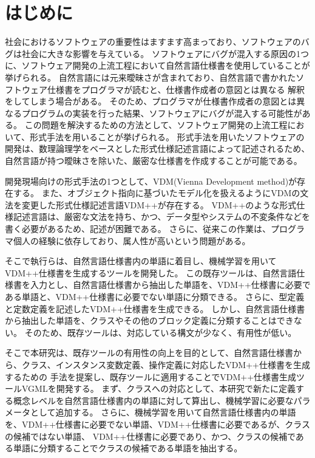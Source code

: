 \chapter{はじめに}
\label{cha:Introduction}

社会におけるソフトウェアの重要性はますます高まっており、ソフトウェアのバグは社会に大きな影響を与えている\cite{}。
ソフトウェアにバグが混入する原因の1つに、ソフトウェア開発の上流工程において自然言語仕様書を使用していることが挙げられる。
自然言語には元来曖昧さが含まれており、自然言語で書かれたソフトウェア仕様書をプログラマが読むと、仕様書作成者の意図とは異なる
解釈をしてしまう場合がある。
そのため、プログラマが仕様書作成者の意図とは異なるプログラムの実装を行った結果、ソフトウェアにバグが混入する可能性がある。
この問題を解決するための方法として、ソフトウェア開発の上流工程において、形式手法を用いることが挙げられる。
形式手法を用いたソフトウェアの開発は、数理論理学をベースとした形式仕様記述言語によって記述されるため、
自然言語が持つ曖昧さを除いた、厳密な仕様書を作成することが可能である。

開発現場向けの形式手法の1つとして、VDM(Vienna Development method)\cite{}が存在する。
また、オブジェクト指向に基づいたモデル化を扱えるようにVDMの文法を変更した形式仕様記述言語VDM++が存在する。
VDM++のような形式仕様記述言語は、厳密な文法を持ち、かつ、データ型やシステムの不変条件などを書く必要があるため、記述が困難である。
さらに、従来この作業は、プログラマ個人の経験に依存しており、属人性が高いという問題がある。

そこで執行らは、自然言語仕様書内の単語に着目し、機械学習を用いてVDM++仕様書を生成するツールを開発した\cite{}。
この既存ツールは、自然言語仕様書を入力とし、自然言語仕様書から抽出した単語を、VDM++仕様書に必要である単語と、VDM++仕様書に必要でない単語に分類できる。
さらに、型定義と定数定義を記述したVDM++仕様書を生成できる。
しかし、自然言語仕様書から抽出した単語を、クラスやその他のブロック定義に分類することはできない。
そのため、既存ツールは、対応している構文が少なく、有用性が低い。

そこで本研究は、既存ツールの有用性の向上を目的として、自然言語仕様書から、クラス、インスタンス変数定義、操作定義に対応したVDM++仕様書を生成するための
手法を提案し、既存ツールに適用することでVDM++仕様書生成ツールVGMLを開発する。
まず、クラスへの対応として、本研究で新たに定義する概念レベルを自然言語仕様書内の単語に対して算出し、機械学習に必要なパラメータとして追加する。
さらに、機械学習を用いて自然言語仕様書内の単語を、VDM++仕様書に必要でない単語、VDM++仕様書に必要であるが、クラスの候補ではない単語、
VDM++仕様書に必要であり、かつ、クラスの候補である単語に分類することでクラスの候補である単語を抽出する。

